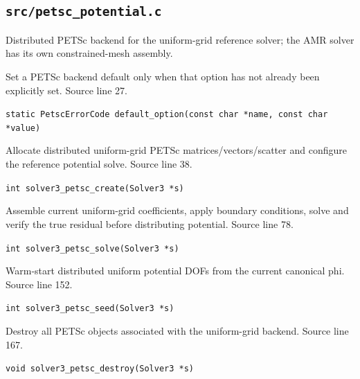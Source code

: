 \subsection{\texttt{src/petsc\_potential.c}}
Distributed PETSc backend for the uniform-grid reference solver; the AMR solver has its own constrained-mesh assembly.
\begin{description}[style=nextline,leftmargin=0pt,labelindent=0pt,labelwidth=0pt,labelsep=0pt]
\item[\texttt{default\_option}] Set a PETSc backend default only when that option has not already been explicitly set. Source line 27.\par
{\small\nolinkurl{static PetscErrorCode default_option(const char *name, const char *value)}}
\item[\texttt{solver3\_petsc\_create}] Allocate distributed uniform-grid PETSc matrices/vectors/scatter and configure the reference potential solve. Source line 38.\par
{\small\nolinkurl{int solver3_petsc_create(Solver3 *s)}}
\item[\texttt{solver3\_petsc\_solve}] Assemble current uniform-grid coefficients, apply boundary conditions, solve and verify the true residual before distributing potential. Source line 78.\par
{\small\nolinkurl{int solver3_petsc_solve(Solver3 *s)}}
\item[\texttt{solver3\_petsc\_seed}] Warm-start distributed uniform potential DOFs from the current canonical phi. Source line 152.\par
{\small\nolinkurl{int solver3_petsc_seed(Solver3 *s)}}
\item[\texttt{solver3\_petsc\_destroy}] Destroy all PETSc objects associated with the uniform-grid backend. Source line 167.\par
{\small\nolinkurl{void solver3_petsc_destroy(Solver3 *s)}}
\end{description}
